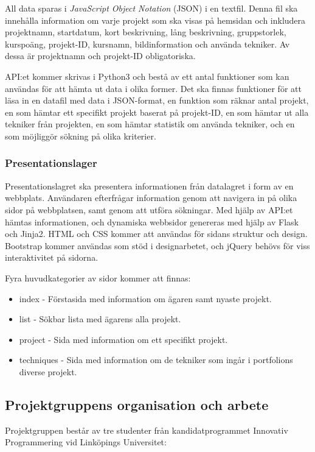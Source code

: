 \documentclass{TDP003mall}
\begin{document}
All data sparas i \textit{JavaScript Object Notation} (JSON) i en textfil. Denna fil ska innehålla information om varje projekt som ska visas på hemsidan och inkludera projektnamn, startdatum, kort beskrivning, lång beskrivning, gruppstorlek, kurspoäng, projekt-ID, kursnamn, bildinformation och använda tekniker. Av dessa är projektnamn och projekt-ID obligatoriska.

API:et kommer skrivas i Python3 och bestå av ett antal funktioner som kan användas för att hämta ut data i olika former. Det ska finnas funktioner för att läsa in en datafil med data i JSON-format, en funktion som räknar antal projekt, en som hämtar ett specifikt projekt baserat på projekt-ID, en som hämtar ut alla tekniker från projekten, en som hämtar statistik om använda tekniker, och en som möjliggör sökning på olika kriterier.

\subsubsection{Presentationslager}
Presentationslagret ska presentera informationen från datalagret i form av en webbplats. Användaren efterfrågar information genom att navigera in på olika sidor på webbplatsen, samt genom att utföra sökningar. Med hjälp av API:et hämtas informationen, och dynamiska webbsidor genereras med hjälp av Flask och Jinja2. HTML och CSS kommer att användas för sidans struktur och design. Bootstrap kommer användas som stöd i designarbetet, och jQuery behövs för viss interaktivitet på sidorna.

Fyra huvudkategorier av sidor kommer att finnas:
\begin{itemize}
\item index - Förstasida med information om ägaren samt nyaste projekt.
\item list - Sökbar lista med ägarens alla projekt.
\item project - Sida med information om ett specifikt projekt.
\item techniques - Sida med information om de tekniker som ingår i portfolions diverse projekt.
\end{itemize}



\subsection{Projektgruppens organisation och arbete}
Projektgruppen består av tre studenter från kandidatprogrammet Innovativ Programmering vid Linköpings Universitet:
\end{document}
